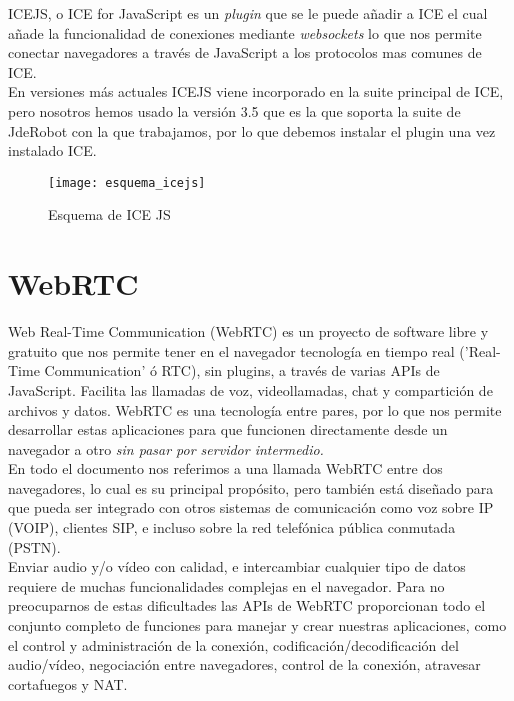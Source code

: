 ICEJS, o ICE for JavaScript es un \textit{plugin} que se le puede añadir a ICE el cual añade la funcionalidad de conexiones mediante \textit{websockets} lo que nos permite conectar navegadores a través de JavaScript a los protocolos mas comunes de ICE. \\

En versiones más actuales ICEJS viene incorporado en la suite principal de ICE, pero nosotros hemos usado la versión 3.5 que es la que soporta la suite de JdeRobot con la que trabajamos, por lo que debemos instalar el plugin una vez instalado ICE.\\

\begin{figure}[htb]
\centering
\texttt{[image: esquema\_icejs]}
\caption{Esquema de ICE JS}
\label{fig:esquema_icejs}
\end{figure}

\section{WebRTC}

Web Real-Time Communication (WebRTC) es un proyecto de software libre y gratuito que nos permite tener en el navegador tecnología en tiempo real ('Real-Time Communication' ó RTC), sin plugins, a través de varias APIs de JavaScript. Facilita las llamadas de voz, videollamadas, chat y compartición de archivos y datos. WebRTC es una tecnología entre pares, por lo que nos permite desarrollar estas aplicaciones para que funcionen directamente desde un navegador a otro \emph{sin pasar por servidor intermedio.}\\

En todo el documento nos referimos a una llamada WebRTC entre dos navegadores, lo cual es su principal propósito, pero también está diseñado para que pueda ser integrado con otros sistemas de comunicación como voz sobre IP (VOIP), clientes SIP, e incluso sobre la red telefónica pública conmutada (PSTN).\\

Enviar audio y/o vídeo con calidad, e intercambiar cualquier tipo de datos requiere de muchas funcionalidades complejas en el navegador. Para no preocuparnos de estas dificultades las APIs de WebRTC proporcionan todo el conjunto completo de funciones para manejar y crear nuestras aplicaciones, como el control y administración de la conexión, codificación/decodificación del audio/vídeo, negociación entre navegadores, control de la conexión, atravesar cortafuegos y NAT.\\

